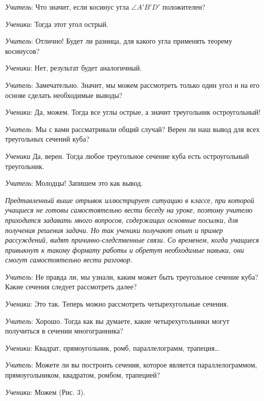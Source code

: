 \documentclass[a4paper,14pt,russian]{extreport}
\begin{document}
\textit{Учитель}: Что значит, если косинус угла $\angle A'B'D'$ положителен?

\textit{Ученики}: Тогда этот угол острый.

\textit{Учитель}: Отлично! Будет ли разница, для какого угла применять теорему косинусов?

\textit{Ученики}: Нет, результат будет аналогичный.

\textit{Учитель}: Замечательно. Значит, мы можем рассмотреть только один угол и на его основе сделать необходимые выводы?

\textit{Ученики}: Да, можем. Тогда все углы острые, а значит треугольник остроугольный!

\textit{Учитель}: Мы с вами рассматривали общий случай? Верен ли наш вывод для всех треугольных сечений куба?

\textit{Ученики} Да, верен. Тогда любое треугольное сечение куба есть остроугольный треугольник.

\textit{Учитель}: Молодцы! Запишем это как вывод.

\textit{Предтавленный выше отрывок иллюстрирует ситуацию в классе, при которой учащиеся не готовы самостоятельно вести беседу на уроке, поэтому учителю приходится задавать много вопросов, содержащих основные посылки, для получения решения задачи. Но так ученики получают опыт и пример рассуждений, видят причинно-следственные связи. Со временем, когда учащиеся привыкнут к такому формату работы и обретут необходимые навыки, они смогут самостоятельно вести  разговор.}

\textit{Учитель}: Не правда ли, мы узнали, каким может быть треугольное сечение куба? Какие сечения следует рассмотреть далее?

\textit{Ученики}: Это так. Теперь можно рассмотреть четырехугольные сечения.

\textit{Учитель}: Хорошо. Тогда как вы думаете, какие четырехугольники могут получиться в сечении многогранника?

\textit{Ученики}: Квадрат, прямоугольник, ромб, параллелограмм, трапеция…

\textit{Учитель}: Можете ли вы построить сечения, которое является параллелограммом, прямоугольником, квадратом, ромбом, трапецией?

\textit{Ученики}: Можем (Рис. 3).
\end{document}
